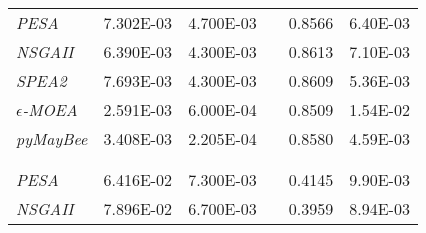 \begin{table}
\begin{tabular}{L{4cm} c c c c c}
  \addlinespace[\defaultaddspace]
                                                                                \\
  \midrule
  \textit{PESA}            & \num{7.302E-03} & \num{4.700E-03} & & \num{0.8566} & \num{6.40E-03} \\
  \textit{NSGAII}          & \num{6.390E-03} & \num{4.300E-03} & &  \num{0.8613} & \num{7.10E-03} \\
  \textit{SPEA2}           & \num{7.693E-03} & \num{4.300E-03} & & \num{0.8609} & \num{5.36E-03} \\
  \textit{$\epsilon$-MOEA} &  \num{2.591E-03} & \num{6.000E-04} & & \num{0.8509} & \num{1.54E-02} \\
  \textit{pyMayBee}        & \num{3.408E-03} &  \num{2.205E-04} & & \num{0.8580} &  \num{4.59E-03} \\
  \\
  \addlinespace[\defaultaddspace]
                                                                                \\
  \midrule
  \textit{PESA}            & \num{6.416E-02} & \num{7.300E-03} & & \num{0.4145} & \num{9.90E-03} \\
  \textit{NSGAII}          & \num{7.896E-02} & \num{6.700E-03} & & \num{0.3959} & \num{8.94E-03} \\

\end{tabular}
\end{table}
